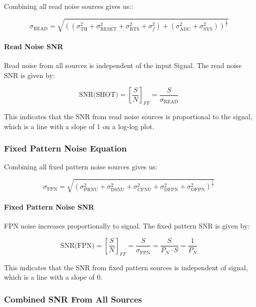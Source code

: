 \documentclass[10pt]{article}
\begin{document}
Combining all read noise sources gives us::

$$ \sigma_{\text{READ}} = \sqrt{  \left ( (\sigma^2_{\text{TH}} + \sigma^2_{\text{RESET}} + \sigma^2_{\text{RTS}} + \sigma^2_f) + ( \sigma^2_{\text{ADC}} + \sigma^2_{\text{SYS}}) \right )^{\frac{1}{2}} }     $$

\paragraph{Read Noise SNR}

Read noise from all sources is independent of the input Signal. The read noise SNR is given by:

$$ \text{SNR(SHOT)} = \left [ \frac{S}{N} \right ] _ {FF} = \frac{S}{\sigma_{\text{READ}}} $$

This indicates that the SNR from read noise sources is proportional to the signal, which is a line with a slope of 1 on a log-log plot.

\vspace{2mm}

\subsubsection{Fixed Pattern Noise Equation}

Combining all fixed pattern noise sources gives us:

$$ \sigma_{\text{FPN}} = \sqrt{  \left ( \sigma^2_{\text{PRNU}} + \sigma^2_{\text{DSNU}} + \sigma^2_{\text{CFNU}} + \sigma^2_{\text{DFPN}} + \sigma^2_{\text{OFPN}} \right )^{\frac{1}{2}} }     $$

\paragraph{Fixed Pattern Noise SNR}

FPN noise increases proportionally to signal. The fixed pattern SNR is given by:

$$ \text{SNR(FPN)} = \left [ \frac{S}{N} \right ] _ {FF} = \frac{S}{\sigma_{\text{FPN}}} = \frac{S}{P_N \cdot S} = \frac{1}{P_N} $$

\vspace{2mm}

This indicates that the SNR from fixed pattern sources is independent of signal, which is a line with a slope of 0.

\subsubsection{Combined SNR From All Sources}
\end{document}
